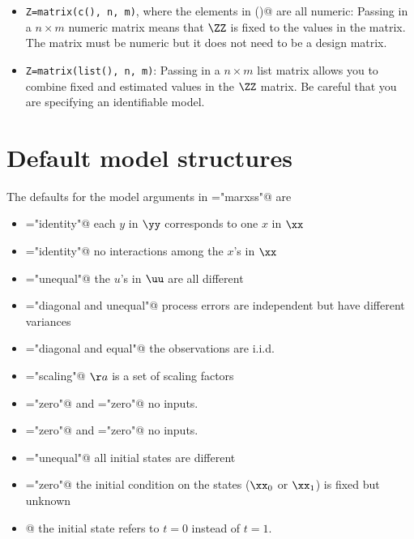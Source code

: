 \begin{itemize}
\item[] \texttt{Z=matrix(c(), n, m)}, where the elements in \verb@c()@ are all numeric:  Passing in a $n \times m$ numeric matrix means that $\ZZ$ is fixed to the values in the matrix. The matrix must be numeric but it does not need to be a design matrix.

\item[] \texttt{Z=matrix(list(), n, m)}:  Passing in a $n \times m$ list matrix allows you to combine fixed and estimated values in the $\ZZ$ matrix.  Be careful that you are specifying an identifiable model.

\end{itemize}

\section{Default model structures}
 The defaults for the model arguments in \verb@form="marxss"@ are
\begin{itemize}
\item[] \verb@Z="identity"@ each $y$ in $\yy$ corresponds to one $x$ in $\xx$
\item[] \verb@B="identity"@ no interactions among the $x$'s in $\xx$
\item[] \verb@U="unequal"@ the $u$'s in $\uu$ are all different
\item[] \verb@Q="diagonal and unequal"@ process errors are independent but have different variances
\item[] \verb@R="diagonal and equal"@ the observations are i.i.d.
\item[] \verb@A="scaling"@ $\aa$ is a set of scaling factors
\item[] \verb@C="zero"@ and \verb@D="zero"@ no inputs.
\item[] \verb@c="zero"@ and \verb@d="zero"@ no inputs.
\item[] ="unequal"@ all initial states are different
\item[] ="zero"@ the initial condition on the states ($\xx_0$ or $\xx_1$) is fixed but unknown
\item[] @ the initial state refers to $t=0$ instead of $t=1$.
\end{itemize}

